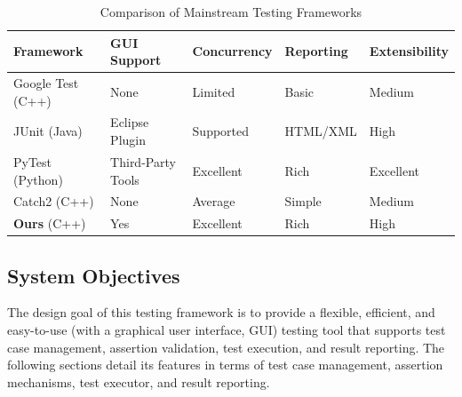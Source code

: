 \documentclass[english]{article}
\begin{document}
\begin{table}[h]
    \centering
    \caption{Comparison of Mainstream Testing Frameworks}
    \label{tab:compare}
    \begin{tabularx}{\textwidth}{lXXXX}
        \toprule
        \textbf{Framework}  & \textbf{GUI Support} & \textbf{Concurrency} & \textbf{Reporting} & \textbf{Extensibility} \\
        \midrule
        Google Test (C++)   & None                 & Limited              & Basic              & Medium                 \\
        JUnit (Java)        & Eclipse Plugin       & Supported            & HTML/XML           & High                   \\
        PyTest (Python)     & Third-Party Tools    & Excellent            & Rich               & Excellent              \\
        Catch2 (C++)        & None                 & Average              & Simple             & Medium                 \\
        \textbf{Ours} (C++) & Yes                  & Excellent            & Rich               & High                   \\
        \bottomrule
    \end{tabularx}
\end{table}
\subsection{System Objectives}%
The design goal of this testing framework is to provide a flexible, efficient, and easy-to-use (with a graphical user interface, GUI) testing tool that supports test case management, assertion validation, test execution, and result reporting. The following sections detail its features in terms of test case management, assertion mechanisms, test executor, and result reporting.
\end{document}
